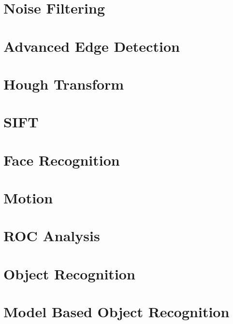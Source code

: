 \documentclass{article}
\begin{document}
	\section{Noise Filtering}

	\section{Advanced Edge Detection}

	\section{Hough Transform}

	\section{SIFT}

	\section{Face Recognition}

	\section{Motion}

	\section{ROC Analysis}

	\section{Object Recognition}

	\section{Model Based Object Recognition}
	\newpage
	\printindex
\end{document}
